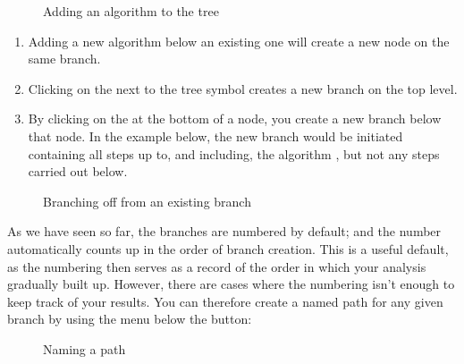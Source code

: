 \documentclass[letterpaper,10pt,english]{sphinxmanual}
\begin{document}
\begin{figure}[htbp]
\centering
\capstart

\noindent{}
\caption{Adding an algorithm to the tree}\label{\detokenize{clicanalysis/flexiconc:id6}}\label{\detokenize{clicanalysis/flexiconc:flexiclic-algo}}\end{figure}
\begin{enumerate}
%
\item {} 
\sphinxAtStartPar
Adding a new algorithm below an existing one will create a new node
on the same branch.

\item {} 
\sphinxAtStartPar
Clicking on the  next to the tree symbol creates a new
branch on the top level.

\item {} 
\sphinxAtStartPar
By clicking on the  at the bottom of a node, you
create a new branch below that node. In the example below, the new
branch would be initiated containing all steps up to, and including,
the algorithm , but not any
steps carried out below.

\end{enumerate}

\begin{figure}[htbp]
\centering
\capstart

\noindent{}
\caption{Branching off from an existing branch}\label{\detokenize{clicanalysis/flexiconc:id7}}\label{\detokenize{clicanalysis/flexiconc:flexiclic-algo-options}}\end{figure}

\sphinxAtStartPar
As we have seen so far, the branches are numbered by default; and the
number automatically counts up in the order of branch creation. This is
a useful default, as the numbering then serves as a record of the order
in which your analysis gradually built up. However, there are cases
where the numbering isn’t enough to keep track of your results. You can
therefore create a named path for any given branch by using the menu
below the  button:

\begin{figure}[htbp]
\centering
\capstart

\noindent{}
\caption{Naming a path}\label{\detokenize{clicanalysis/flexiconc:id8}}\label{\detokenize{clicanalysis/flexiconc:flexiclic-named-path}}\end{figure}
\end{document}
